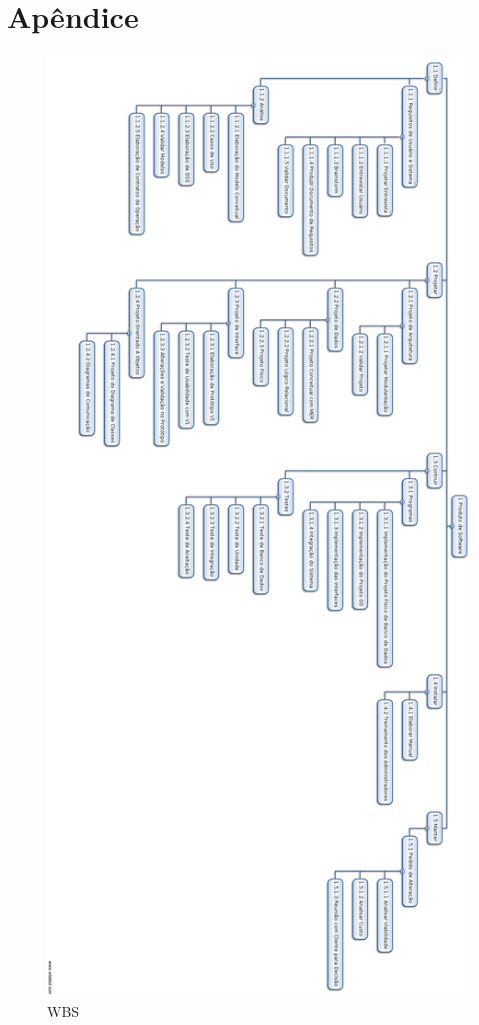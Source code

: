 \documentclass[a4paper,11pt]{article}
\begin{document}
\section{Apêndice}\label{apendice}
		\begin{figure}[!H]
    		\centering
        	\includegraphics[width=\textwidth,height=\dimexpr\textheight-3\baselineskip\relax,keepaspectratio]{WBS.png}
        	\caption{WBS}
     		\label{WBS}
    	\end{figure}
\end{document}

